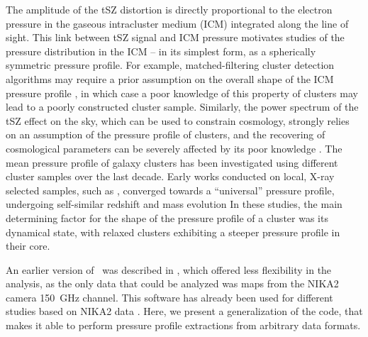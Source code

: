 The amplitude of the tSZ distortion is directly proportional to the electron pressure in the gaseous intracluster medium (ICM) integrated along the line of sight.
This link between tSZ signal and ICM pressure motivates studies of the pressure distribution in the ICM -- in its simplest form, as a spherically symmetric pressure profile.
For example, matched-filtering cluster detection algorithms may require a prior assumption on the overall shape of the ICM pressure profile \citep[\eg][]{melin_comparison_2012}, in which case a poor knowledge of this property of clusters may lead to a poorly constructed cluster sample.
Similarly, the power spectrum of the tSZ effect on the sky, which can be used to constrain cosmology, strongly relies on an assumption of the pressure profile of clusters, and the recovering of cosmological parameters can be severely affected by its poor knowledge \citep{ruppin_impact_2019}.
The mean pressure profile of galaxy clusters has been investigated using different cluster samples over the last decade.
Early works conducted on local, X-ray selected samples, such as \citet[][hereafter \aten]{arnaud_universal_2010}, converged towards a ``universal'' pressure profile, undergoing self-similar redshift and mass evolution \citep[see also \eg][]{battaglia_cluster_2012-1, planck_collaboration_planck_2013}
In these studies, the main determining factor for the shape of the pressure profile of a cluster was its dynamical state, with relaxed clusters exhibiting a steeper pressure profile in their core.

\textcolor{lightgray}{\lipsum[1]}


An earlier version of \panco\ was described in \citet{keruzore_panco2_2021}, which offered less flexibility in the analysis, as the only data that could be analyzed was maps from the NIKA2 camera 150~GHz channel\citep{adam_nika2_2018, perotto_calibration_2020}.
This software has already been used for different studies based on NIKA2 data \citep[\eg][]{artis_psz2_2022,munoz-echeverria_multi-probe_2022,munoz-echeverria_lpsz-clash_2022}.
Here, we present a generalization of the code, that makes it able to perform pressure profile extractions from arbitrary data formats.



